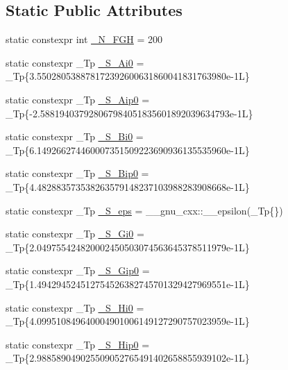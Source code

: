 \subsection*{Static Public Attributes}
\begin{DoxyCompactItemize}
\item 
static constexpr int \hyperlink{classstd_1_1____detail_1_1__Airy__series_a01e903f238d8c10c82cea4c115612ad8}{\+\_\+\+N\+\_\+\+F\+GH} = 200
\item 
static constexpr \+\_\+\+Tp \hyperlink{classstd_1_1____detail_1_1__Airy__series_a530108939a1c52d530e1d2ff577195b2}{\+\_\+\+S\+\_\+\+Ai0} = \+\_\+\+Tp\{3.\+550280538878172392600631860041831763980e-\/1\+L\}
\item 
static constexpr \+\_\+\+Tp \hyperlink{classstd_1_1____detail_1_1__Airy__series_a9a0a96224f581add2488a885f08c810f}{\+\_\+\+S\+\_\+\+Aip0} = \+\_\+\+Tp\{-\/2.\+588194037928067984051835601892039634793e-\/1\+L\}
\item 
static constexpr \+\_\+\+Tp \hyperlink{classstd_1_1____detail_1_1__Airy__series_a9ad4abe8477f8b28acc85d305f378f82}{\+\_\+\+S\+\_\+\+Bi0} = \+\_\+\+Tp\{6.\+149266274460007351509223690936135535960e-\/1\+L\}
\item 
static constexpr \+\_\+\+Tp \hyperlink{classstd_1_1____detail_1_1__Airy__series_a153d931f593516a030505f7fd96845e7}{\+\_\+\+S\+\_\+\+Bip0} = \+\_\+\+Tp\{4.\+482883573538263579148237103988283908668e-\/1\+L\}
\item 
static constexpr \+\_\+\+Tp \hyperlink{classstd_1_1____detail_1_1__Airy__series_aeeb50187c007e2436a80dde35250cabd}{\+\_\+\+S\+\_\+eps} = \+\_\+\+\_\+gnu\+\_\+cxx\+::\+\_\+\+\_\+epsilon(\+\_\+\+Tp\{\})
\item 
static constexpr \+\_\+\+Tp \hyperlink{classstd_1_1____detail_1_1__Airy__series_a1ffe2a989d5ab598db201c77d08dc96d}{\+\_\+\+S\+\_\+\+Gi0} = \+\_\+\+Tp\{2.\+049755424820002450503074563645378511979e-\/1\+L\}
\item 
static constexpr \+\_\+\+Tp \hyperlink{classstd_1_1____detail_1_1__Airy__series_aa2269595bf85d349e9e5a1e6e4abb1a4}{\+\_\+\+S\+\_\+\+Gip0} = \+\_\+\+Tp\{1.\+494294524512754526382745701329427969551e-\/1\+L\}
\item 
static constexpr \+\_\+\+Tp \hyperlink{classstd_1_1____detail_1_1__Airy__series_a9968426a52459123041f5fc11d73a854}{\+\_\+\+S\+\_\+\+Hi0} = \+\_\+\+Tp\{4.\+099510849640004901006149127290757023959e-\/1\+L\}
\item 
static constexpr \+\_\+\+Tp \hyperlink{classstd_1_1____detail_1_1__Airy__series_a848fb790433db9dc427f9dd37a33da39}{\+\_\+\+S\+\_\+\+Hip0} = \+\_\+\+Tp\{2.\+988589049025509052765491402658855939102e-\/1\+L\}

\end{DoxyCompactItemize}
